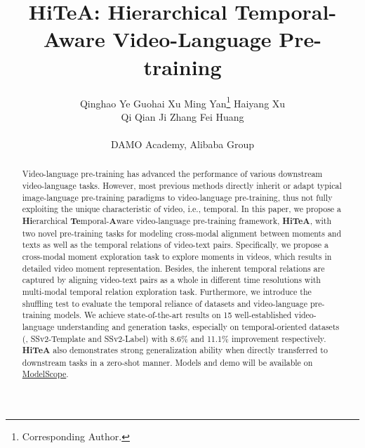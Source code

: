 \documentclass[10pt,twocolumn,letterpaper]{article}
\newcommand{\modelname}{\textbf{HiTeA}\xspace}
\begin{document}
\title{\textbf{HiTeA}: Hierarchical Temporal-Aware Video-Language Pre-training}

\author{Qinghao Ye
\quad Guohai Xu
\quad Ming Yan\thanks{Corresponding Author.}
\quad Haiyang Xu \\
Qi Qian
\quad Ji Zhang
\quad Fei Huang \\ \\
DAMO Academy, Alibaba Group \\
}
\maketitle

\begin{abstract}
  Video-language pre-training has advanced the performance of various downstream video-language tasks. However, most previous methods directly inherit or adapt typical image-language pre-training paradigms to video-language pre-training, thus not fully exploiting the unique characteristic of video, i.e., temporal. In this paper, we propose a \textbf{Hi}erarchical \textbf{Te}mporal-\textbf{A}ware video-language pre-training framework, \modelname, with two novel pre-training tasks for 
 modeling cross-modal alignment between moments and texts as well as the temporal relations of video-text pairs. Specifically, we propose a cross-modal moment exploration task to explore moments in videos, which results in detailed video moment representation. 
Besides, the inherent temporal relations are captured by aligning video-text pairs as a whole in different time resolutions with multi-modal temporal relation exploration task. Furthermore, we introduce the shuffling test to evaluate the temporal reliance of datasets and video-language pre-training models. We achieve state-of-the-art results on 15 well-established video-language understanding and generation tasks, especially on temporal-oriented datasets (\eg, SSv2-Template and SSv2-Label) with 8.6\% and 11.1\% improvement respectively. \modelname also demonstrates strong generalization ability when directly transferred to downstream tasks in a zero-shot manner. Models and demo will be available on \href{https://www.modelscope.cn/}{ModelScope}.
  
\end{abstract}

\vspace{-2ex}
\end{document}
